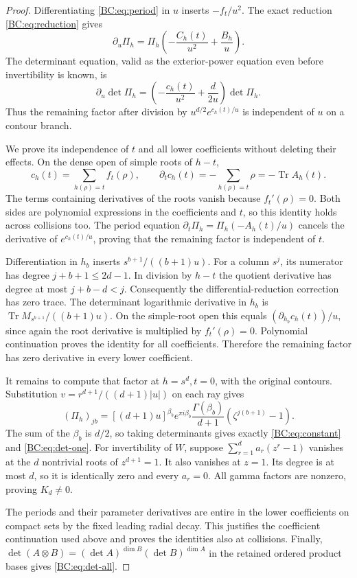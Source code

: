 \documentclass[11pt,a4paper]{article}
\DeclareMathOperator{\Tr}{Tr}
\begin{document}
\begin{proof}
Differentiating \eqref{BC:eq:period} in $u$ inserts $-f_t/u^2$.
The exact reduction \eqref{BC:eq:reduction} gives
\[
 \partial_u\Pi_h=\Pi_h\left(-\frac{C_h(t)}{u^2}
                                    +\frac{B_h}u\right).
\]
The determinant equation, valid as the exterior-power equation even
before invertibility is known, is
\begin{equation}
 \partial_u\det\Pi_h=
     \left(-\frac{c_h(t)}{u^2}+\frac d{2u}\right)\det\Pi_h.
 \label{BC:eq:det-ode}
\end{equation}
Thus the remaining factor after division by $u^{d/2}e^{c_h(t)/u}$
is independent of $u$ on a contour branch.

We prove its independence of $t$ and all lower coefficients without
deleting their effects.  On the dense open of simple roots of $h-t$,
\[
 c_h(t)=\sum_{h(\rho)=t}f_t(\rho),\qquad
 \partial_t c_h(t)=-\sum_{h(\rho)=t}\rho=-\Tr A_h(t).
\]
The terms containing derivatives of the roots vanish because
$f_t'(\rho)=0$.  Both sides are polynomial expressions in the
coefficients and $t$, so this identity holds across collisions too.
The period equation
$\partial_t\Pi_h=\Pi_h(-A_h(t)/u)$ cancels the derivative of
$e^{c_h(t)/u}$, proving that the remaining factor is independent of $t$.

Differentiation in $h_b$ inserts $s^{b+1}/((b+1)u)$.  For a column
$s^j$, its numerator has degree $j+b+1\le2d-1$.
In division by $h-t$ the quotient derivative has degree at most
$j+b-d<j$.  Consequently the differential-reduction correction has
zero trace.  The determinant logarithmic derivative in $h_b$ is
$\Tr M_{s^{b+1}}/((b+1)u)$.  On the simple-root open this equals
$(\partial_{h_b}c_h(t))/u$, since again the root derivative is multiplied
by $f_t'(\rho)=0$.  Polynomial continuation proves the identity for all
coefficients.  Therefore the remaining factor has zero derivative in
every lower coefficient.

It remains to compute that factor at $h=s^d,t=0$, with the original
contours.  Substitution $v=r^{d+1}/((d+1)|u|)$ on each ray gives
\begin{equation}
 (\Pi_h)_{jb}
  =[(d+1)u]^{\beta_b}e^{\pi i\beta_b}
        \frac{\Gamma(\beta_b)}{d+1}
             (\zeta^{j(b+1)}-1).
 \label{BC:eq:gamma-columns}
\end{equation}
The sum of the $\beta_b$ is $d/2$, so taking determinants gives
exactly \eqref{BC:eq:constant} and \eqref{BC:eq:det-one}.
For invertibility of $W$, suppose
$\sum_{r=1}^d a_r(z^r-1)$ vanishes at the $d$ nontrivial roots of
$z^{d+1}=1$.  It also vanishes at $z=1$.  Its degree is at most $d$,
so it is identically zero and every $a_r=0$.  All gamma factors are
nonzero, proving $K_d\ne0$.

The periods and their parameter derivatives are entire in the lower
coefficients on compact sets by the fixed leading radial decay.
This justifies the coefficient continuation used above and proves the
identities also at collisions.  Finally,
$\det(A\otimes B)=(\det A)^{\dim B}(\det B)^{\dim A}$ in the
retained ordered product bases gives \eqref{BC:eq:det-all}.
\end{proof}
\end{document}

